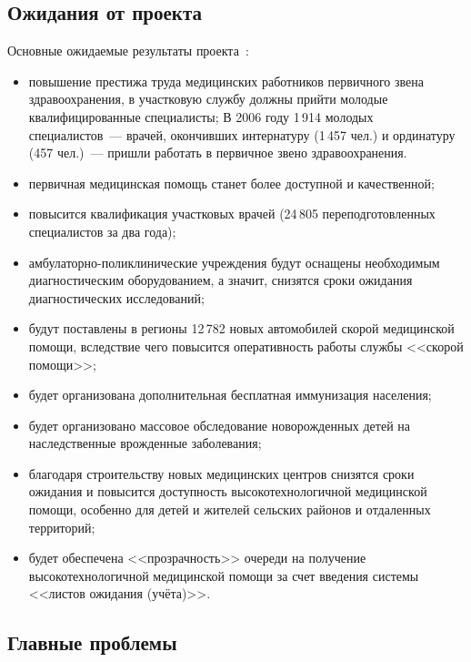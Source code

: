 \documentclass[article, 12pt, russian, oneside]{ncc}
\begin{document}
\subsection{Ожидания от проекта}

Основные ожидаемые результаты проекта~\cite{Health_Waitings}:

\begin{itemize}
\item повышение престижа труда медицинских работников первичного звена
  здравоохранения, в участковую службу должны прийти молодые
  квалифицированные специалисты; В 2006 году 1\,914 молодых
  специалистов~--- врачей, окончивших интернатуру (1\,457 чел.) и
  ординатуру (457 чел.)~--- пришли работать в первичное звено
  здравоохранения.
\item первичная медицинская помощь станет более доступной и
  качественной;
\item повысится квалификация участковых врачей (24\,805
  переподготовленных специалистов за два года);
\item амбулаторно-поликлинические учреждения будут оснащены
  необходимым диагностическим оборудованием, а значит, снизятся сроки
  ожидания диагностических исследований;
\item будут поставлены в регионы 12\,782 новых автомобилей скорой
  медицинской помощи, вследствие чего повысится оперативность работы
  службы <<скорой помощи>>;
\item будет организована дополнительная бесплатная иммунизация
  населения;
\item будет организовано массовое обследование новорожденных детей на
  наследственные врожденные заболевания;
\item благодаря строительству новых медицинских центров снизятся сроки
  ожидания и повысится доступность высокотехнологичной медицинской
  помощи, особенно для детей и жителей сельских районов и отдаленных
  территорий;
\item будет обеспечена <<прозрачность>> очереди на получение
  высокотехнологичной медицинской помощи за счет введения системы
  <<листов ожидания (учёта)>>.
\end{itemize}

\subsection{Главные проблемы}
\end{document}
